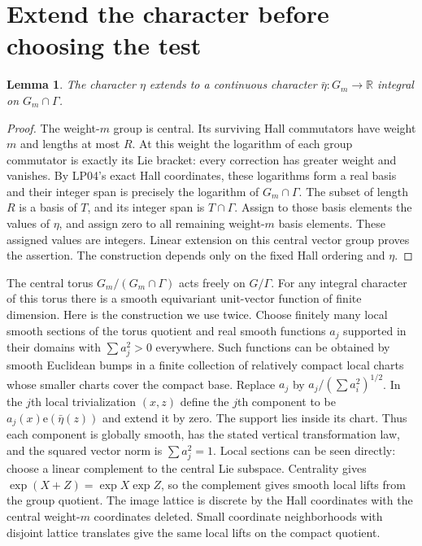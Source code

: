 \documentclass[11pt]{article}
\newtheorem{lemma}[theorem]{Lemma}
\newcommand{\R}{\mathbb R}\newcommand{\Z}{\mathbb Z}
\newcommand{\ee}{\mathrm e}\newcommand{\Lie}{\operatorname{Lie}}
\begin{document}
\section{Extend the character before choosing the test}
\begin{lemma}\label{lem:extension}
The character $\eta$ extends to a continuous character
$\bar\eta:G_m\to\R$ integral on $G_m\cap\Gamma$.
\end{lemma}
\begin{proof}
The weight-$m$ group is central. Its surviving Hall commutators have
weight $m$ and lengths at most $R$. At this weight the logarithm of each
group commutator is exactly its Lie bracket: every correction has greater
weight and vanishes. By LP04's exact Hall coordinates, these logarithms
form a real basis and their integer span is precisely the logarithm of
$G_m\cap\Gamma$. The subset of length $R$ is a basis of $T$, and its
integer span is $T\cap\Gamma$. Assign to those basis elements the values
of $\eta$, and assign zero to all remaining weight-$m$ basis elements.
These assigned values are integers. Linear extension on this central
vector group proves the assertion. The construction depends only on the
fixed Hall ordering and $\eta$.
\end{proof}

The central torus $G_m/(G_m\cap\Gamma)$ acts freely on $G/\Gamma$.
For any integral character of this torus there is a smooth equivariant
unit-vector function of finite dimension. Here is the construction we use
twice. Choose finitely many local smooth sections of the torus quotient
and real smooth functions $a_j$ supported in their domains with
$\sum a_j^2>0$ everywhere. Such functions can be obtained by smooth
Euclidean bumps in a finite collection of relatively compact local charts
whose smaller charts cover the compact base. Replace $a_j$ by
$a_j/(\sum a_i^2)^{1/2}$. In the $j$th local trivialization $(x,z)$ define
the $j$th component to be $a_j(x)\ee(\bar\eta(z))$ and extend it by zero.
The support lies inside its chart. Thus each component is globally smooth,
has the stated vertical transformation law, and the squared vector norm
is $\sum a_j^2=1$. Local sections can be seen directly: choose a linear
complement to the central Lie subspace. Centrality gives
$\exp(X+Z)=\exp X\exp Z$, so the complement gives smooth local lifts
from the group quotient. The image lattice is discrete by the Hall
coordinates with the central weight-$m$ coordinates deleted. Small
coordinate neighborhoods with disjoint lattice translates give the same
local lifts on the compact quotient.
\end{document}
